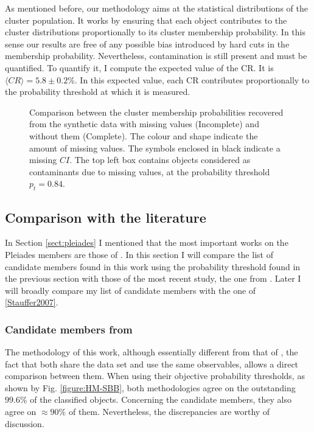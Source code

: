 As mentioned before, our methodology aims at the statistical distributions of the cluster population. It works by ensuring that each object contributes to the cluster distributions proportionally to its cluster membership probability. In this sense our results are free of any possible bias introduced by hard cuts in the membership probability. Nevertheless, contamination is still present and must be quantified. To quantify it, I compute the expected value of the CR. It is $\langle CR \rangle=5.8\pm 0.2$\%. In this expected value, each CR contributes proportionally to the  probability threshold at which it is measured. 

\begin{figure}[!htp]
\begin{center}
\caption{Comparison between the cluster membership probabilities recovered from the synthetic data with missing values (Incomplete) and without them (Complete). The colour and shape indicate the amount of missing values. The symbols enclosed in black indicate a missing $CI$. The top left box contains objects considered as contaminants due to missing values, at the probability threshold $p_t=0.84$.}
\label{figure:IncVsCom}
\end{center}
\end{figure}
 
\subsection{Comparison with the literature}
In Section \ref{sect:pleiades} I mentioned that the most important works on the Pleiades members are those of \citet{Stauffer2007,Lodieu2012,Sarro2014,Bouy2015}. In this section I will compare the list of candidate members found in this work using the probability threshold found in the previous section with those of the most recent study, the one from \citet{Bouy2015}. Later I will broadly compare my list of candidate members with the one of \ref{Stauffer2007}. 
\subsubsection{Candidate members from \citet{Bouy2015}}
The methodology of this work, although essentially different from that of \citet{Bouy2015}, the fact that both share the data set and use the same observables, allows a direct comparison between them. When using their objective probability thresholds, as shown by Fig. \ref{figure:HM-SBB}, both methodologies agree on the outstanding $99.6$\% of the classified objects. Concerning the candidate members, they also agree on $\approx 90\%$ of them. Nevertheless, the discrepancies are worthy of discussion.

